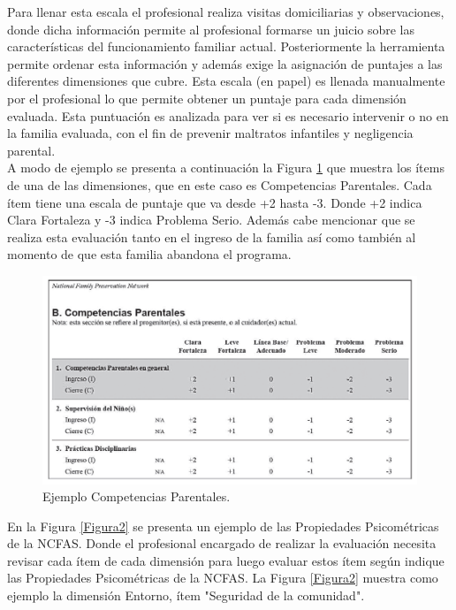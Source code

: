 Para llenar esta escala el profesional realiza visitas domiciliarias y observaciones, donde dicha información permite al profesional formarse un juicio sobre las características del funcionamiento familiar actual. Posteriormente la herramienta permite ordenar esta información y además exige la asignación de puntajes a las diferentes dimensiones que cubre. 
Esta escala (en papel) es llenada manualmente por el profesional lo que permite obtener un puntaje para cada dimensión evaluada. Esta puntuación es analizada para ver si es necesario intervenir o no en la familia evaluada, con el fin de prevenir maltratos infantiles y negligencia parental\cite{VALENCIA2010}.\\

A modo de ejemplo se presenta a continuación la Figura \ref{Figura1} que muestra los ítems de una de las dimensiones, que en este caso es Competencias Parentales. Cada ítem tiene una escala de puntaje que va desde +2 hasta -3.
Donde +2 indica Clara Fortaleza y -3 indica Problema Serio. Además cabe mencionar que se realiza esta evaluación tanto en el ingreso de la familia así como también al momento de que esta familia abandona el programa. 

\begin{figure}[htb]
	\label{Figura1}
	\begin{center}
		\includegraphics[scale=0.6]{imagenes/NCFAS.png}
	\end{center}
	\caption{Ejemplo Competencias Parentales.}
\end{figure}

\newpage

En la Figura \ref{Figura2} se presenta un ejemplo de las Propiedades Psicométricas de la NCFAS. Donde el profesional encargado de realizar la evaluación necesita revisar cada ítem de cada dimensión para luego evaluar estos ítem según indique las Propiedades Psicométricas de la NCFAS. 
La Figura \ref{Figura2} muestra como ejemplo la dimensión Entorno, ítem "Seguridad de la comunidad". 

